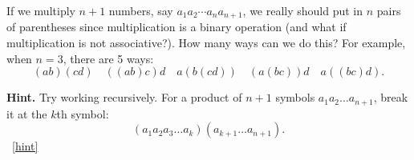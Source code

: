 \documentclass{book}
\begin{document}
\setcounter{project}{175}
\addtocounter{project}{-1}
\begin{activity}[]\label{act-parenthesize}
\hypertarget{p-1014}{}%
If we multiply \(n+1\) numbers, say \(a_1a_2\cdots a_n a_{n+1}\), we really should put in \(n\) pairs of parentheses since multiplication is a binary operation (and what if multiplication is not associative?).  How many ways can we do this?  For example, when \(n = 3\), there are 5 ways:%
\begin{equation*}
(ab)(cd)\quad ((ab)c)d \quad a(b(cd)) \quad (a(bc))d \quad a((bc)d).
\end{equation*}
%
\par\smallskip%
\noindent\textbf{Hint.}\hypertarget{hint-114}{}\quad%
\hypertarget{p-1015}{}%
Try working recursively.   For a product of \(n+1\) symbols \(a_{1}a_{2}\ldots a_{n+1}\), break it at the \(k\)th symbol:%
\begin{equation*}
(a_{1}a_{2}a_{3}\ldots a_{k})(a_{k + 1}\ldots a_{n+1}).
\end{equation*}
%
~\hfill{\tiny\hyperlink{a-175}{[hint]}\hypertarget{q-175}{}}\end{activity}

\clearpage
\end{document}
